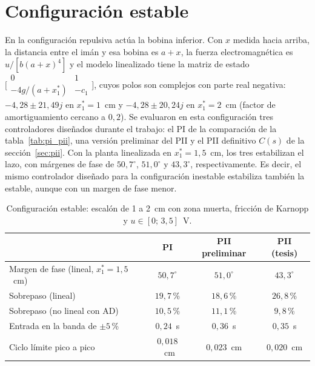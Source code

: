 \section{Configuración estable}

En la configuración repulsiva actúa la bobina inferior. Con $x$ medida hacia arriba, la distancia entre el imán y esa bobina es $a+x$, la fuerza electromagnética es $u/[b(a+x)^4]$ y el modelo linealizado tiene la matriz de estado $\bigl[\begin{smallmatrix}0&1\\-4g/(a+x_1^*)&-c_1\end{smallmatrix}\bigr]$, cuyos polos son complejos con parte real negativa: $-4{,}28\pm21{,}49j$ en $x_1^*=1$~cm y $-4{,}28\pm20{,}24j$ en $x_1^*=2$~cm (factor de amortiguamiento cercano a $0{,}2$). Se evaluaron en esta configuración tres controladores diseñados durante el trabajo: el PI de la comparación de la tabla~\ref{tab:pi_pii}, una versión preliminar del PII y el PII definitivo $C(s)$ de la sección~\ref{sec:pii}. Con la planta linealizada en $x_1^*=1{,}5$~cm, los tres estabilizan el lazo, con márgenes de fase de $50{,}7^\circ$, $51{,}0^\circ$ y $43{,}3^\circ$, respectivamente. Es decir, el mismo controlador diseñado para la configuración inestable estabiliza también la estable, aunque con un margen de fase menor.

\begin{table}[ht]
\centering
\caption{Configuración estable: escalón de 1 a 2~cm con zona muerta, fricción de Karnopp y $u\in[0;\,3{,}5]$~V.}
\label{tab:p8_estable}
\begin{tabular}{|l|c|c|c|}
\hline
 & PI & PII preliminar & PII (tesis) \\ \hline
Margen de fase (lineal, $x_1^*=1{,}5$~cm) & $50{,}7^\circ$ & $51{,}0^\circ$ & $43{,}3^\circ$ \\ \hline
Sobrepaso (lineal) & $19{,}7$\,\% & $18{,}6$\,\% & $26{,}8$\,\% \\ \hline
Sobrepaso (no lineal con AD) & $10{,}5$\,\% & $11{,}1$\,\% & $9{,}8$\,\% \\ \hline
Entrada en la banda de $\pm5$\,\% & $0{,}24$~s & $0{,}36$~s & $0{,}35$~s \\ \hline
Ciclo límite pico a pico & $0{,}018$~cm & $0{,}023$~cm & $0{,}020$~cm \\ \hline
\end{tabular}
\end{table}

